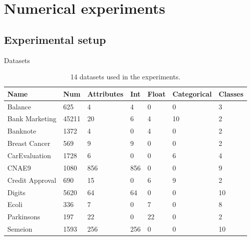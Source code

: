 \documentclass[preprint,12pt]{elsarticle}
\begin{document}
\section{Numerical experiments}
\label{sec_exp}

\subsection{Experimental setup}

Datasets

\begin{table}[]
\caption{14 datasets used in the experiments.}
\label{tab:1}
\begin{tabular}{lllllll}
\hline
Name                                                            & Num   & Attributes & Int & Float & Categorical & Classes \\ \hline
Balance                                                         & 625   & 4          & 4   & 0     & 0           & 3       \\
Bank Marketing                                                  & 45211 & 20         & 6   & 4     & 10          & 2       \\
Banknote                                                        & 1372  & 4          & 0   & 4     & 0           & 2       \\
Breast Cancer                                                   & 569   & 9          & 9   & 0     & 0           & 2       \\
CarEvaluation                                                   & 1728  & 6          & 0   & 0     & 6           & 4       \\
CNAE9                                                           & 1080  & 856        & 856 & 0     & 0           & 9       \\
Credit Approval                                                 & 690   & 15         & 0   & 6     & 9           & 2       \\
Digits                                                          & 5620  & 64         & 64  & 0     & 0           & 10      \\
Ecoli                                                           & 336   & 7          & 0   & 7     & 0           & 8       \\
Parkinsons                                                      & 197   & 22         & 0   & 22    & 0           & 2       \\
Semeion                                                         & 1593  & 256        & 256 & 0     & 0           & 10      \\

\end{tabular}
\end{table}
\end{document}
